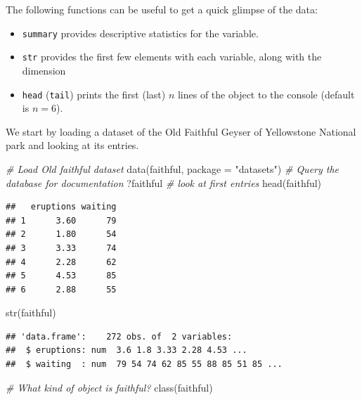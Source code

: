 \documentclass[
  11pt,
  letterpaper,
]{book}
\newenvironment{Shaded}{\begin{snugshade}}{\end{snugshade}}
\newcommand{\AttributeTok}[1]{\textcolor[rgb]{0.77,0.63,0.00}{#1}}
\newcommand{\CommentTok}[1]{\textcolor[rgb]{0.56,0.35,0.01}{\textit{#1}}}
\newcommand{\FunctionTok}[1]{\textcolor[rgb]{0.00,0.00,0.00}{#1}}
\newcommand{\NormalTok}[1]{#1}
\newcommand{\StringTok}[1]{\textcolor[rgb]{0.31,0.60,0.02}{#1}}
\providecommand{\tightlist}{%
  \setlength{\itemsep}{0pt}\setlength{\parskip}{0pt}}
\theoremstyle{definition}
\theoremstyle{definition}
\theoremstyle{definition}
\theoremstyle{definition}
\theoremstyle{remark}
\begin{document}
The following functions can be useful to get a quick glimpse of the data:

\begin{itemize}
\tightlist
\item
  \texttt{summary} provides descriptive statistics for the variable.
\item
  \texttt{str} provides the first few elements with each variable, along with the dimension
\item
  \texttt{head} (\texttt{tail}) prints the first (last) \(n\) lines of the object to the console (default is \(n=6\)).
\end{itemize}

We start by loading a dataset of the Old Faithful Geyser of Yellowstone National park and looking at its entries.

\begin{Shaded}
\begin{Highlighting}[]
\CommentTok{\# Load Old faithful dataset}
\FunctionTok{data}\NormalTok{(faithful, }\AttributeTok{package =} \StringTok{"datasets"}\NormalTok{)}
\CommentTok{\# Query the database for documentation}
\NormalTok{?faithful}
\CommentTok{\# look at first entries}
\FunctionTok{head}\NormalTok{(faithful)}
\end{Highlighting}
\end{Shaded}

\begin{verbatim}
##   eruptions waiting
## 1      3.60      79
## 2      1.80      54
## 3      3.33      74
## 4      2.28      62
## 5      4.53      85
## 6      2.88      55
\end{verbatim}

\begin{Shaded}
\begin{Highlighting}[]
\FunctionTok{str}\NormalTok{(faithful)}
\end{Highlighting}
\end{Shaded}

\begin{verbatim}
## 'data.frame':    272 obs. of  2 variables:
##  $ eruptions: num  3.6 1.8 3.33 2.28 4.53 ...
##  $ waiting  : num  79 54 74 62 85 55 88 85 51 85 ...
\end{verbatim}

\begin{Shaded}
\begin{Highlighting}[]
\CommentTok{\# What kind of object is faithful? }
\FunctionTok{class}\NormalTok{(faithful)}
\end{Highlighting}
\end{Shaded}
\end{document}
